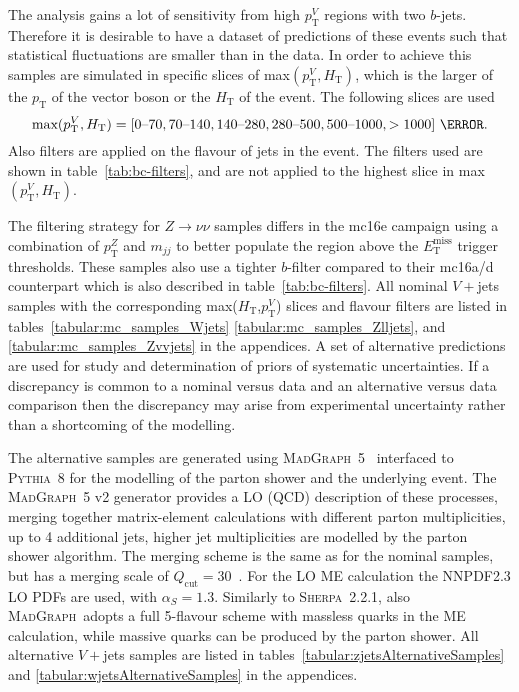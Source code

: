 The analysis gains a lot of sensitivity from high $p_{\mathrm{T}}^V$ regions
with two $b$-jets. Therefore it is desirable to have a dataset of predictions
of these events such that statistical fluctuations are smaller than in the data.
In order to achieve this samples are simulated in specific slices of
max$(p_{\mathrm{T}}^V, H_{\mathrm{T}})$, which is the larger of the
$p_{\mathrm{T}}$ of the vector boson or the $H_{\mathrm{T}}$ of the event.
The following slices are used
\begin{equation*}
  \text{max}(p_{\mathrm{T}}^V, H_{\mathrm{T}}) =
  [0\text{--}70, 70\text{--}140, 140\text{--}280,
  280\text{--}500, 500\text{--}1000, >1000]~\GeV.
\end{equation*}
Also filters are applied on the flavour of jets in the event. The filters used
are shown in table~\ref{tab:bc-filters}, and are not applied to the highest
slice in max$(p_{\mathrm{T}}^V, H_{\mathrm{T}})$.

The filtering strategy for $Z\to\nu\nu$ samples differs in the mc16e campaign using
a combination of $p_{\mathrm{T}}^Z$ and $m_{jj}$ to better populate the region
above the $E_{\mathrm{T}}^{\text{miss}}$ trigger thresholds. These samples also
use a tighter $b$-filter compared to their mc16a/d counterpart which is also
described in table~\ref{tab:bc-filters}. All nominal $V+$jets samples with the
corresponding max($H_{\mathrm{T}}$,$p_{\mathrm{T}}^V$) slices and flavour
filters are listed in tables~\ref{tabular:mc_samples_Wjets}
\ref{tabular:mc_samples_Zlljets}, and
\ref{tabular:mc_samples_Zvvjets} in the appendices. A set of alternative
predictions are used for study and determination of priors of systematic
uncertainties. If a discrepancy is common to a nominal versus data and an
alternative versus data comparison then the discrepancy may arise from
experimental uncertainty rather than a shortcoming of the modelling.

The alternative samples are generated using
\textsc{MadGraph}~5~\cite{MADGRAPH5_aMC@NLO} interfaced to \textsc{Pythia}~8 for
the modelling of the parton shower and the underlying event. The
\textsc{MadGraph}~5 v2 generator provides a LO (QCD) description of these
processes, merging together matrix-element calculations with different parton
multiplicities, up to 4 additional jets, higher jet multiplicities are modelled
by the parton shower algorithm. The merging scheme is the same as for the
nominal samples, but has a merging scale of $Q_{\text{cut}} = 30$~\GeV. For the
LO ME calculation the NNPDF2.3 LO PDFs are used, with $\alpha_S = 1.3$.
Similarly to
\textsc{Sherpa}~2.2.1, also \textsc{MadGraph}~adopts a full 5-flavour scheme
with massless quarks in the ME calculation, while massive quarks can be produced
by the parton shower. All alternative $V+$jets samples are listed in
tables~\ref{tabular:zjetsAlternativeSamples} and
\ref{tabular:wjetsAlternativeSamples} in the appendices.


